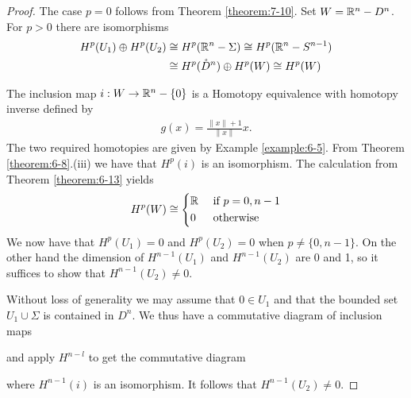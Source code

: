 \begin{proof}
  The case $p = 0$ follows from Theorem \ref{theorem:7-10}. Set $W=\mathbb{R}^n-D^n$. 
  For $p > 0$ there are isomorphisms
  \begin{align*}
    H^p(U_1)\oplus H^p(U_2) 
    & \cong H^p(\mathbb{R}^n -\Sigma ) \cong H^p(\mathbb{R}^n -S^{n-1} )\\
    & \cong H^p(\mathring{D}^n)\oplus H^p(W)\cong H^p(W)
  \end{align*}

  The inclusion map $i:W\to\mathbb{R}^n-\{0\}$ is a Homotopy equivalence with homotopy inverse defined by 
  \begin{align*}
    g(x) = \frac{\|x\| +  1}{\|x\|}x.
  \end{align*}
  The two required homotopies are given by Example \ref{example:6-5}. From Theorem 
  \ref{theorem:6-8}.(iii) we have that $H^p(i)$ is an isomorphism. The calculation from 
  Theorem \ref{theorem:6-13} yields
  \begin{align*}
    H^p(W) \cong \left\{\begin{aligned}
      & \mathbb{R} && \text{ if } p = 0, n-1 \\
      & 0 && \text{ otherwise }
    \end{aligned}\right.
  \end{align*}
  We now have that $H^p(U_1) = 0$ and $H^p(U_2) = 0$ when $p\neq \{0, n-1\}$. On the other hand the dimension
  of $H^{n-1}(U_1)$ and $H^{n-1}(U_2)$ are 0 and 1, so it suffices to show that $H^{n-1}(U_2)\neq 0$.

  Without loss of generality we may assume that $0\in U_1$ and that the bounded set
  $U_1\cup\Sigma$ is contained in $D^n$. We thus have a commutative diagram of inclusion maps

  \begin{center}
  \end{center}

  and apply $H^{n - l}$ to get the commutative diagram
  \begin{center}
  \end{center}
  where $H^{n-1}(i)$ is an isomorphism. It follows that $H^{n-1}(U_2)\neq 0$.
\end{proof}

